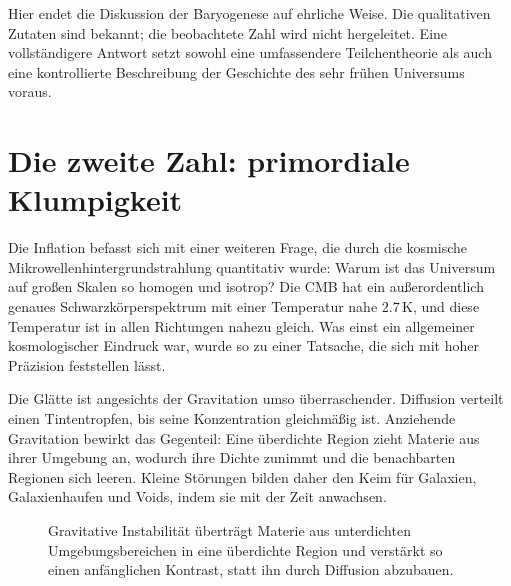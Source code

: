 Hier endet die Diskussion der Baryogenese auf ehrliche Weise. Die qualitativen Zutaten sind bekannt; die beobachtete Zahl wird nicht hergeleitet. Eine vollständigere Antwort setzt sowohl eine umfassendere Teilchentheorie als auch eine kontrollierte Beschreibung der Geschichte des sehr frühen Universums voraus.

\section{Die zweite Zahl: primordiale Klumpigkeit}

Die Inflation befasst sich mit einer weiteren Frage, die durch die kosmische Mikrowellenhintergrundstrahlung quantitativ wurde: Warum ist das Universum auf großen Skalen so homogen und isotrop? Die CMB hat ein außerordentlich genaues Schwarzkörperspektrum mit einer Temperatur nahe \(2.7\,\mathrm K\), und diese Temperatur ist in allen Richtungen nahezu gleich. Was einst ein allgemeiner kosmologischer Eindruck war, wurde so zu einer Tatsache, die sich mit hoher Präzision feststellen lässt.

Die Glätte ist angesichts der Gravitation umso überraschender. Diffusion verteilt einen Tintentropfen, bis seine Konzentration gleichmäßig ist. Anziehende Gravitation bewirkt das Gegenteil: Eine überdichte Region zieht Materie aus ihrer Umgebung an, wodurch ihre Dichte zunimmt und die benachbarten Regionen sich leeren. Kleine Störungen bilden daher den Keim für Galaxien, Galaxienhaufen und Voids, indem sie mit der Zeit anwachsen.

\begin{figure}[htbp]
\centering
\begin{coursefitfigure}
\end{coursefitfigure}
\caption{Gravitative Instabilität überträgt Materie aus unterdichten Umgebungsbereichen in eine überdichte Region und verstärkt so einen anfänglichen Kontrast, statt ihn durch Diffusion abzubauen.}
\label{fig:c08-gravity-growth}
\end{figure}

